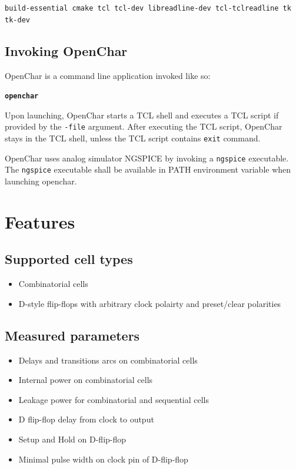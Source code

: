 \documentclass[12pt, a4paper]{article}
\begin{document}
\texttt{build-essential cmake tcl tcl-dev libreadline-dev tcl-tclreadline tk tk-dev}

\subsection{Invoking OpenChar}

OpenChar is a command line application invoked like so:

\texttt{\textbf{openchar}}\newline
\hspace*{1cm}\newline
\hspace*{1cm}\newline

Upon launching, OpenChar starts a TCL shell and executes a TCL script if provided
by the \texttt{-file} argument. After executing the TCL script,
OpenChar stays in the TCL shell, unless the TCL script contains \texttt{exit}
command.

OpenChar uses analog simulator NGSPICE by invoking a \texttt{ngspice} executable.
The \texttt{ngspice} executable shall be available in PATH environment variable
when launching openchar.


\pagebreak
\section{Features}

\subsection{Supported cell types}

\begin{itemize}
    \item{Combinatorial cells}
    \item{D-style flip-flops with arbitrary clock polairty and preset/clear polarities}
\end{itemize}

\subsection{Measured parameters}

\begin{itemize}
    \item{Delays and transitions arcs on combinatorial cells}
    \item{Internal power on combinatorial cells}
    \item{Leakage power for combinatorial and sequential cells}
    \item{D flip-flop delay from clock to output}
    \item{Setup and Hold on D-flip-flop}
    \item{Minimal pulse width on clock pin of D-flip-flop}
\end{itemize}
\end{document}
